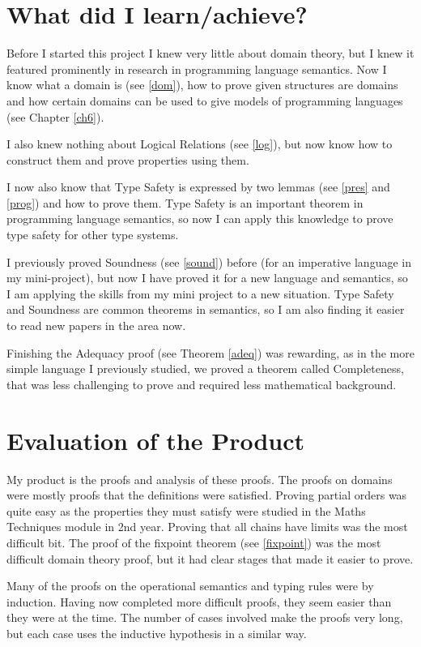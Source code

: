 \section{What did I learn/achieve?}
Before I started this project I knew very little about domain theory, but I knew it featured prominently in research in programming language semantics. Now I know what a domain is (see \ref{dom}), how to prove given structures are domains and how certain domains can be used to give models of programming languages (see Chapter \ref{ch6}).

I also knew nothing about Logical Relations (see \ref{log}), but now know how to construct them and prove properties using them.

I now also know that Type Safety is expressed by two lemmas (see \ref{pres} and \ref{prog}) and how to prove them. Type Safety is an important theorem in programming language semantics, so now I can apply this knowledge to prove type safety for other type systems.

I previously proved Soundness (see \ref{sound}) before (for an imperative language in my mini-project), but now I have proved it for a new language and semantics, so I am applying the skills from my mini project to a new situation. Type Safety and Soundness are common theorems in semantics, so I am also finding it easier to read new papers in the area now.

Finishing the Adequacy proof (see Theorem \ref{adeq}) was rewarding, as in the more simple language I previously studied, we proved a theorem called Completeness, that was less challenging to prove and required less mathematical background.
 
\section{Evaluation of the Product}
My product is the proofs and analysis of these proofs. The proofs on domains were mostly proofs that the definitions were satisfied. Proving partial orders was quite easy as the properties they must satisfy were studied in the Maths Techniques module in 2nd year. Proving that all chains have limits was the most difficult bit. The proof of the fixpoint theorem (see \ref{fixpoint}) was the most difficult domain theory proof, but it had clear stages that made it easier to prove.

Many of the proofs on the operational semantics and typing rules were by induction. Having now completed more difficult proofs, they seem easier than they were at the time. The number of cases involved make the proofs very long, but each case uses the inductive hypothesis in a similar way.  

